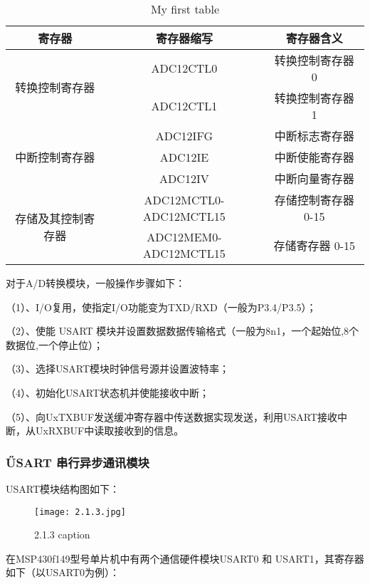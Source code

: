 \documentclass[12pt]{article} %
\begin{document}
		
		
		
\begin{table}[h]
			\begin{tabular}{|c|c|c|}
			\hline
		寄存器 & 寄存器缩写 & 寄存器含义  \\
		\hline
		\multirow{2}{*}{转换控制寄存器} & ADC12CTL0 & 转换控制寄存器 0 \\
		\cline{2-3}
		& ADC12CTL1 & 转换控制寄存器 1 \\
		\hline
		\multirow{3}{*}{中断控制寄存器} & ADC12IFG & 中断标志寄存器 \\
		
		\cline{2-3}
		& ADC12IE & 中断使能寄存器 \\
		\cline{2-3}
		& ADC12IV & 中断向量寄存器 \\
		\hline
		\multirow{2}{*}{存储及其控制寄存器} & ADC12MCTL0-ADC12MCTL15 & 存储控制寄存器 0-15 \\
		\cline{2-3}
		&ADC12MEM0-ADC12MCTL15 & 存储寄存器 0-15 \\
		\hline
\end{tabular}
\caption{My first table}
\end{table}
	对于A/D转换模块，一般操作步骤如下：
	\par（1）、I/O复用，使指定I/O功能变为TXD/RXD（一般为P3.4/P3.5）；
	 	\par （2）、使能 USART 模块并设置数据数据传输格式（一般为8n1，一个起始位,8个数据位,一个停止位）；
	 	\par （3）、选择USART模块时钟信号源并设置波特率；
	 	\par （4）、初始化USART状态机并使能接收中断；
	 	\par （5）、向UxTXBUF发送缓冲寄存器中传送数据实现发送，利用USART接收中断，从UxRXBUF中读取接收到的信息。
		
			
					
	 	\subsubsection{\H USART 串行异步通讯模块} 
	 	USART模块结构图如下：
	 	\begin{figure}[H] %
 		  \centering
 		  \texttt{[image: 2.1.3.jpg]} 
  		  \caption{2.1.3 caption}
  		 \label{fig:2.1.3}
		\end{figure}
		在MSP430f149型号单片机中有两个通信硬件模块USART0 和 USART1，其寄存器如下（以USART0为例）：
		
\end{document}
